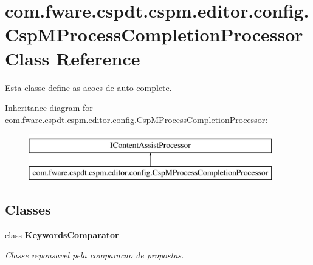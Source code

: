 \hypertarget{classcom_1_1fware_1_1cspdt_1_1cspm_1_1editor_1_1config_1_1_csp_m_process_completion_processor}{}\section{com.\+fware.\+cspdt.\+cspm.\+editor.\+config.\+Csp\+M\+Process\+Completion\+Processor Class Reference}
\label{classcom_1_1fware_1_1cspdt_1_1cspm_1_1editor_1_1config_1_1_csp_m_process_completion_processor}


Esta classe define as acoes de auto complete.  


Inheritance diagram for com.\+fware.\+cspdt.\+cspm.\+editor.\+config.\+Csp\+M\+Process\+Completion\+Processor\+:\begin{figure}[H]
\begin{center}
\leavevmode
\includegraphics[height=2.000000cm]{classcom_1_1fware_1_1cspdt_1_1cspm_1_1editor_1_1config_1_1_csp_m_process_completion_processor}
\end{center}
\end{figure}
\subsection*{Classes}
\begin{DoxyCompactItemize}
\item 
class {\bfseries Keywords\+Comparator}
\begin{DoxyCompactList}\small\item\em Classe reponsavel pela comparacao de propostas. \end{DoxyCompactList}\end{DoxyCompactItemize}

